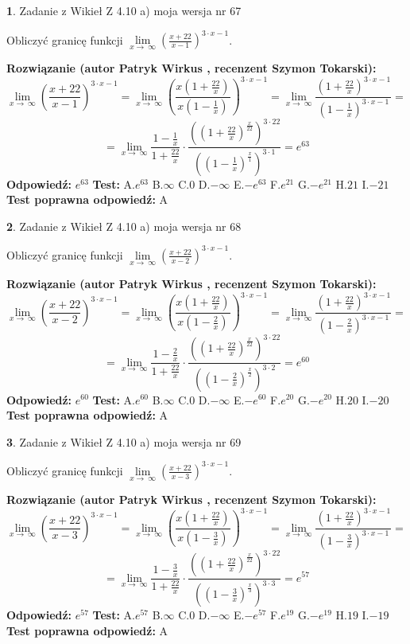 \documentclass[12pt, a4paper]{article}
\theoremstyle{definition} %
\newtheorem{zad}{}
\newcommand{\zadStart}[1]{\begin{zad}#1\newline}
\newcommand{\zadStop}{\end{zad}}
\newcommand{\rozwStart}[2]{\noindent \textbf{Rozwiązanie (autor #1 , recenzent #2): }\newline}
\newcommand{\rozwStop}{\newline}
\newcommand{\odpStart}{\noindent \textbf{Odpowiedź:}\newline}
\newcommand{\odpStop}{\newline}
\newcommand{\testStart}{\noindent \textbf{Test:}\newline}
\newcommand{\testStop}{\newline}
\newcommand{\kluczStart}{\noindent \textbf{Test poprawna odpowiedź:}\newline}
\newcommand{\kluczStop}{\newline}
\begin{document}
\zadStart{Zadanie z Wikieł Z 4.10 a) moja wersja nr 67}

Obliczyć granicę funkcji  $\lim\limits_{x\to\ \infty}(\frac{x+22}{x-1})^{3\cdot x-1}$.
\zadStop
\rozwStart{Patryk Wirkus}{Szymon Tokarski}
$$\lim\limits_{x\to\ \infty}(\frac{x+22}{x-1})^{3\cdot x-1} = \lim\limits_{x\to\ \infty}(\frac{x(1+\frac{22}{x})}{x(1-\frac{1}{x})})^{3\cdot x-1}=\lim\limits_{x\to\ \infty}\frac{(1+\frac{22}{x})^{3\cdot x-1}}{(1-\frac{1}{x})^{3\cdot x-1}}=$$
$$=\lim\limits_{x\to\ \infty}\frac{1-\frac{1}{x}}{1+\frac{22}{x}}\cdot\frac{((1+\frac{22}{x})^{\frac{x}{22}})^{3\cdot22}}{((1-\frac{1}{x})^{\frac{x}{1}})^{3\cdot1}}=e^{63}$$
\rozwStop
\odpStart
$e^{63}$
\odpStop
\testStart
A.$e^{63}$ B.$\infty$ C.$0$ D.$-\infty$ E.$-e^{63}$
F.$e^{21}$ G.$-e^{21}$
H.$21$
I.$-21$
\testStop
\kluczStart
A
\kluczStop



\zadStart{Zadanie z Wikieł Z 4.10 a) moja wersja nr 68}

Obliczyć granicę funkcji  $\lim\limits_{x\to\ \infty}(\frac{x+22}{x-2})^{3\cdot x-1}$.
\zadStop
\rozwStart{Patryk Wirkus}{Szymon Tokarski}
$$\lim\limits_{x\to\ \infty}(\frac{x+22}{x-2})^{3\cdot x-1} = \lim\limits_{x\to\ \infty}(\frac{x(1+\frac{22}{x})}{x(1-\frac{2}{x})})^{3\cdot x-1}=\lim\limits_{x\to\ \infty}\frac{(1+\frac{22}{x})^{3\cdot x-1}}{(1-\frac{2}{x})^{3\cdot x-1}}=$$
$$=\lim\limits_{x\to\ \infty}\frac{1-\frac{2}{x}}{1+\frac{22}{x}}\cdot\frac{((1+\frac{22}{x})^{\frac{x}{22}})^{3\cdot22}}{((1-\frac{2}{x})^{\frac{x}{2}})^{3\cdot2}}=e^{60}$$
\rozwStop
\odpStart
$e^{60}$
\odpStop
\testStart
A.$e^{60}$ B.$\infty$ C.$0$ D.$-\infty$ E.$-e^{60}$
F.$e^{20}$ G.$-e^{20}$
H.$20$
I.$-20$
\testStop
\kluczStart
A
\kluczStop



\zadStart{Zadanie z Wikieł Z 4.10 a) moja wersja nr 69}

Obliczyć granicę funkcji  $\lim\limits_{x\to\ \infty}(\frac{x+22}{x-3})^{3\cdot x-1}$.
\zadStop
\rozwStart{Patryk Wirkus}{Szymon Tokarski}
$$\lim\limits_{x\to\ \infty}(\frac{x+22}{x-3})^{3\cdot x-1} = \lim\limits_{x\to\ \infty}(\frac{x(1+\frac{22}{x})}{x(1-\frac{3}{x})})^{3\cdot x-1}=\lim\limits_{x\to\ \infty}\frac{(1+\frac{22}{x})^{3\cdot x-1}}{(1-\frac{3}{x})^{3\cdot x-1}}=$$
$$=\lim\limits_{x\to\ \infty}\frac{1-\frac{3}{x}}{1+\frac{22}{x}}\cdot\frac{((1+\frac{22}{x})^{\frac{x}{22}})^{3\cdot22}}{((1-\frac{3}{x})^{\frac{x}{3}})^{3\cdot3}}=e^{57}$$
\rozwStop
\odpStart
$e^{57}$
\odpStop
\testStart
A.$e^{57}$ B.$\infty$ C.$0$ D.$-\infty$ E.$-e^{57}$
F.$e^{19}$ G.$-e^{19}$
H.$19$
I.$-19$
\testStop
\kluczStart
A
\kluczStop
\end{document}
